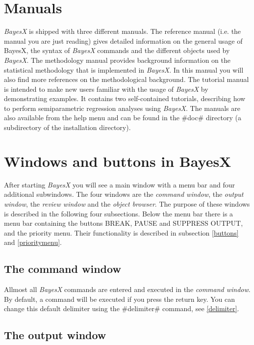 \section{Manuals}\label{bayesxmanuals}

{\em BayesX} is shipped with three different manuals. The
reference manual (i.e. the manual you are just reading) gives
detailed information on the general usage of BayesX, the syntax of
{\em BayesX} commands and the different objects used by {\em
BayesX}. The methodology manual provides background information on
the statistical methodology that is implemented in {\em BayesX}.
In this manual you will also find more references on the
methodological background. The tutorial manual is intended to make
new users familiar with the usage of {\em BayesX} by demonstrating
examples. It contains two self-contained tutorials, describing how
to perform semiparametric regression analyses using {\em BayesX}.
The manuals are also available from the help menu and can be found
in the #doc# directory (a subdirectory of the installation
directory).

\section{Windows and buttons in BayesX}\label{bayesxwindows}

After starting {\em BayesX} you will see a main window with a menu
bar and four additional subwindows. The four windows are the {\em
command window}, the {\em output window}, the {\em review window}
and the {\em object browser}. The purpose of these windows is
described in the following four subsections. Below the menu bar
there is a menu bar containing the buttons BREAK, PAUSE and
SUPPRESS OUTPUT, and the priority menu. Their functionality is
described in subsection \ref{buttons} and \ref{prioritymenu}.

\subsection{The command window}
 

Allmost all {\em BayesX} commands are entered and executed in the
{\em command window}. By default, a command will be executed if
you press the return key. You can change this default delimiter
using the #delimiter# command, see \autoref{delimiter}.

\subsection{The output window}
 

